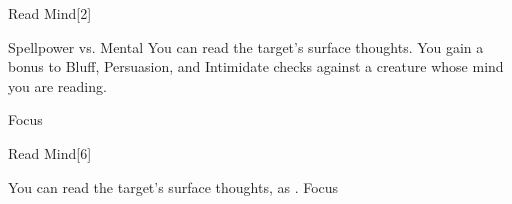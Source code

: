 \begin{spellsection}{Read Mind}[2]
    \begin{spellheader}
    \end{spellheader}
    \begin{spellcontent}
        \begin{spelltargetinginfo}
        \end{spelltargetinginfo}
        \begin{spelleffects}
            \begin{spellattack}{Spellpower vs. Mental}
                \spellsuccess You can read the target's surface thoughts. You gain a  bonus to Bluff, Persuasion, and Intimidate checks against a creature whose mind you are reading.
            \end{spellattack}
            \spelldur Focus
        \end{spelleffects}
    \end{spellcontent}
    \begin{spellfooter}
        \miscastrandom
    \end{spellfooter}
\end{spellsection}

\begin{spellsection}[Greater]{Read Mind}[6]
    \begin{spellheader}
    \end{spellheader}
    \begin{spellcontent}
        \begin{spelltargetinginfo}
        \end{spelltargetinginfo}
        \begin{spelleffects}
            \spelleffect You can read the target's surface thoughts, as .
            \spelldur Focus
        \end{spelleffects}
    \end{spellcontent}
    \begin{spellfooter}
        \miscastrandom
    \end{spellfooter}
\end{spellsection}

